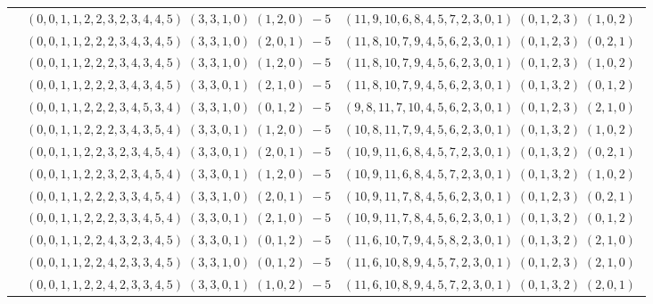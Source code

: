 \documentclass[11pt]{article}
\begin{document}
\begin{longtable}[l]{|c|c|c|}
 \cline{2-3} 
 & $(0 ,0 ,1 ,1 ,2 ,2 ,3 ,2 ,3 ,4 ,4 ,5) \;(3 ,3 ,1 ,0) \;(1 ,2 ,0) \;-5$ & $(11 ,9 ,10 ,6 ,8 ,4 ,5 ,7 ,2 ,3 ,0 ,1) \;(0 ,1 ,2 ,3) \;(1 ,0 ,2) \;$\\ 
 \cline{2-3} 
 & $(0 ,0 ,1 ,1 ,2 ,2 ,2 ,3 ,4 ,3 ,4 ,5) \;(3 ,3 ,1 ,0) \;(2 ,0 ,1) \;-5$ & $(11 ,8 ,10 ,7 ,9 ,4 ,5 ,6 ,2 ,3 ,0 ,1) \;(0 ,1 ,2 ,3) \;(0 ,2 ,1) \;$\\ 
 \cline{2-3} 
 & $(0 ,0 ,1 ,1 ,2 ,2 ,2 ,3 ,4 ,3 ,4 ,5) \;(3 ,3 ,1 ,0) \;(1 ,2 ,0) \;-5$ & $(11 ,8 ,10 ,7 ,9 ,4 ,5 ,6 ,2 ,3 ,0 ,1) \;(0 ,1 ,2 ,3) \;(1 ,0 ,2) \;$\\ 
 \cline{2-3} 
 & $(0 ,0 ,1 ,1 ,2 ,2 ,2 ,3 ,4 ,3 ,4 ,5) \;(3 ,3 ,0 ,1) \;(2 ,1 ,0) \;-5$ & $(11 ,8 ,10 ,7 ,9 ,4 ,5 ,6 ,2 ,3 ,0 ,1) \;(0 ,1 ,3 ,2) \;(0 ,1 ,2) \;$\\ 
 \cline{2-3} 
 & $(0 ,0 ,1 ,1 ,2 ,2 ,2 ,3 ,4 ,5 ,3 ,4) \;(3 ,3 ,1 ,0) \;(0 ,1 ,2) \;-5$ & $(9 ,8 ,11 ,7 ,10 ,4 ,5 ,6 ,2 ,3 ,0 ,1) \;(0 ,1 ,2 ,3) \;(2 ,1 ,0) \;$\\ 
 \cline{2-3} 
 & $(0 ,0 ,1 ,1 ,2 ,2 ,2 ,3 ,4 ,3 ,5 ,4) \;(3 ,3 ,0 ,1) \;(1 ,2 ,0) \;-5$ & $(10 ,8 ,11 ,7 ,9 ,4 ,5 ,6 ,2 ,3 ,0 ,1) \;(0 ,1 ,3 ,2) \;(1 ,0 ,2) \;$\\ 
 \cline{2-3} 
 & $(0 ,0 ,1 ,1 ,2 ,2 ,3 ,2 ,3 ,4 ,5 ,4) \;(3 ,3 ,0 ,1) \;(2 ,0 ,1) \;-5$ & $(10 ,9 ,11 ,6 ,8 ,4 ,5 ,7 ,2 ,3 ,0 ,1) \;(0 ,1 ,3 ,2) \;(0 ,2 ,1) \;$\\ 
 \cline{2-3} 
 & $(0 ,0 ,1 ,1 ,2 ,2 ,3 ,2 ,3 ,4 ,5 ,4) \;(3 ,3 ,0 ,1) \;(1 ,2 ,0) \;-5$ & $(10 ,9 ,11 ,6 ,8 ,4 ,5 ,7 ,2 ,3 ,0 ,1) \;(0 ,1 ,3 ,2) \;(1 ,0 ,2) \;$\\ 
 \cline{2-3} 
 & $(0 ,0 ,1 ,1 ,2 ,2 ,2 ,3 ,3 ,4 ,5 ,4) \;(3 ,3 ,1 ,0) \;(2 ,0 ,1) \;-5$ & $(10 ,9 ,11 ,7 ,8 ,4 ,5 ,6 ,2 ,3 ,0 ,1) \;(0 ,1 ,2 ,3) \;(0 ,2 ,1) \;$\\ 
 \cline{2-3} 
 & $(0 ,0 ,1 ,1 ,2 ,2 ,2 ,3 ,3 ,4 ,5 ,4) \;(3 ,3 ,0 ,1) \;(2 ,1 ,0) \;-5$ & $(10 ,9 ,11 ,7 ,8 ,4 ,5 ,6 ,2 ,3 ,0 ,1) \;(0 ,1 ,3 ,2) \;(0 ,1 ,2) \;$\\ 
 \cline{2-3} 
 & $(0 ,0 ,1 ,1 ,2 ,2 ,4 ,3 ,2 ,3 ,4 ,5) \;(3 ,3 ,0 ,1) \;(0 ,1 ,2) \;-5$ & $(11 ,6 ,10 ,7 ,9 ,4 ,5 ,8 ,2 ,3 ,0 ,1) \;(0 ,1 ,3 ,2) \;(2 ,1 ,0) \;$\\ 
 \cline{2-3} 
 & $(0 ,0 ,1 ,1 ,2 ,2 ,4 ,2 ,3 ,3 ,4 ,5) \;(3 ,3 ,1 ,0) \;(0 ,1 ,2) \;-5$ & $(11 ,6 ,10 ,8 ,9 ,4 ,5 ,7 ,2 ,3 ,0 ,1) \;(0 ,1 ,2 ,3) \;(2 ,1 ,0) \;$\\ 
 \cline{2-3} 
 & $(0 ,0 ,1 ,1 ,2 ,2 ,4 ,2 ,3 ,3 ,4 ,5) \;(3 ,3 ,0 ,1) \;(1 ,0 ,2) \;-5$ & $(11 ,6 ,10 ,8 ,9 ,4 ,5 ,7 ,2 ,3 ,0 ,1) \;(0 ,1 ,3 ,2) \;(2 ,0 ,1) \;$\\ 

\end{longtable}
\end{document}
